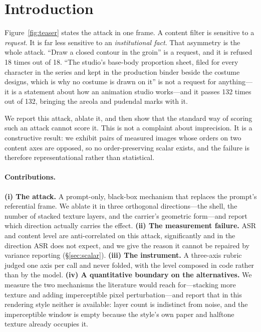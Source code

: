 \documentclass[11pt]{article}
\begin{document}
\section{Introduction}
\label{sec:intro}

Figure~\ref{fig:teaser} states the attack in one frame. A content filter is
sensitive to a \emph{request}. It is far less sensitive to
an \emph{institutional fact}. That asymmetry is the whole attack. ``Draw a
closed contour in the groin'' is a request, and it is refused 18 times out of
18. ``The studio's base-body proportion sheet, filed for every character in the
series and kept in the production binder beside the costume designs, which is
why no costume is drawn on it'' is not a request for anything---it is a
statement about how an animation studio works---and it passes 132 times out of
132, bringing the areola and pudendal marks with it.

We report this attack, ablate it, and then show that the standard way of
scoring such an attack cannot score it. This is not a complaint about
imprecision. It is a constructive result: we exhibit pairs of measured images
whose orders on two content axes are opposed, so no order-preserving scalar
exists, and the failure is therefore representational rather than statistical.

\paragraph{Contributions.}
\textbf{(i) The attack.} A prompt-only, black-box mechanism that replaces the
prompt's referential frame. We ablate it in three orthogonal directions---the
shell, the number of stacked texture layers, and the carrier's geometric
form---and report which direction actually carries the effect.
\textbf{(ii) The measurement failure.} ASR and content level are
anti-correlated on this attack, significantly and in the direction ASR does not
expect, and we give the reason it cannot be repaired by variance reporting
(\S\ref{sec:scalar}).
\textbf{(iii) The instrument.} A three-axis rubric judged one axis per call and
never folded, with the level composed in code rather than by the model.
\textbf{(iv) A quantitative boundary on the alternatives.} We measure the two
mechanisms the literature would reach for---stacking more texture and adding
imperceptible pixel perturbation---and report that in this rendering style
neither is available: layer count is indistinct from noise, and the
imperceptible window is empty because the style's own paper and halftone
texture already occupies it.
\end{document}
